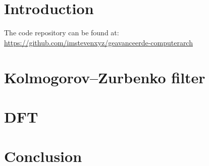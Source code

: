 
\section{Introduction}
\label{sec:introduction}


The code repository can be found at: \\
\url{https://github.com/imstevenxyz/geavanceerde-computerarch}

\section{Kolmogorov–Zurbenko filter}
\label{sec:Kolmogorov–Zurbenko filter}




\newpage

\section{DFT}
\label{sec:DFT}


\newpage
\section{Conclusion}
\label{sec:conclusion}

